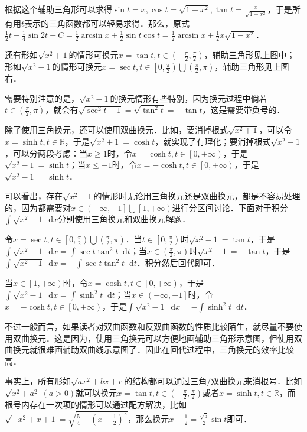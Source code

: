\documentclass{ctexbook}
\newcommand*{\dif}{\mathop{}\!\mathrm{d}}
\begin{document}
\par
根据这个辅助三角形可以求得$\sin{t}=x,\cos{t}=\sqrt{1-x^{2}},\tan{t}=\frac{x}{\sqrt{1-x^{2}}}$，于是所有用$t$表示的三角函数都可以轻易求得．那么，原式$\frac{1}{2}t+\frac{1}{4}\sin{2t}+C=\frac{1}{2}\arcsin{x}+\frac{1}{2}\sin{t}\cos{t}=\frac{1}{2}\arcsin{x}+\frac{1}{2}x\sqrt{1-x^{2}}$．\par
还有形如$\sqrt{x^{2}+1}$的情形可换元$x=\tan{t},t\in\left(-\frac{\pi}{2},\frac{\pi}{2}\right)$，辅助三角形见上图中；形如$\sqrt{x^{2}-1}$的情形可换元$x=\sec{t},t\in\left[0,\frac{\pi}{2}\right)\bigcup\left(\frac{\pi}{2},\pi\right)$，辅助三角形见上图右．\par
需要特别注意的是，$\sqrt{x^{2}-1}$的换元情形有些特别，因为换元过程中倘若$t\in\left(\frac{\pi}{2},\pi\right)$，就会有$\sqrt{\sec^{2}{t}-1}=\sqrt{\tan^{2}{t}}=-\tan{t}$，这是需要带负号的．\par
除了使用三角换元，还可以使用双曲换元．比如，要消掉根式$\sqrt{x^{2}+1}$，可以令$x=\sinh{t},t\in\mathbb{R}$，于是$\sqrt{x^{2}+1}=\cosh{t}$，就实现了有理化；要消掉根式$\sqrt{x^{2}-1}$，可以分两段考虑：当$x\ge1$时，令$x=\cosh{t},t\in\left[0,+\infty\right)$，于是$\sqrt{x^{2}-1}=\sinh{t}$；当$x\le-1$时，令$x=-\cosh{t},t\in\left[0,+\infty\right)$，于是$\sqrt{x^{2}-1}=\sinh{t}$．\par
可以看出，存在$\sqrt{x^{2}-1}$的情形时无论用三角换元还是双曲换元，都是不容易处理的，因为都需要对$x\in\left(-\infty,-1\right]\bigcup\left[1,+\infty\right)$进行分区间讨论．下面对于积分$\int\sqrt{x^{2}-1}\dif{x}$分别使用三角换元和双曲换元解题．\par
令$x=\sec{t},t\in\left[0,\frac{\pi}{2}\right)\bigcup\left(\frac{\pi}{2},\pi\right)$．当$t\in\left[0,\frac{\pi}{2}\right)$时$\sqrt{x^{2}-1}=\tan{t}$，于是$\int\sqrt{x^{2}-1}\dif{x}=\int\sec{t}\tan^{2}{t}\dif{t}$；当$x\in\left(\frac{\pi}{2},\pi\right)$时$\sqrt{x^{2}-1}=-\tan{t}$，于是$\int\sqrt{x^{2}-1}\dif{x}=-\int\sec{t}\tan^{2}{t}\dif{t}$．积分然后回代即可．\par
当$x\in\left[1,+\infty\right)$时，令$x=\cosh{t},t\in\left[0,+\infty\right)$，于是$\int\sqrt{x^{2}-1}\dif{x}=\int\sinh^{2}{t}\dif{t}$；当$x\in\left(-\infty,-1\right]$时，令$x=-\cosh{t},t\in\left[0,+\infty\right)$，于是$\int\sqrt{x^{2}-1}\dif{x}=-\int\sinh^{2}{t}\dif{t}$．\par
不过一般而言，如果读者对双曲函数和反双曲函数的性质比较陌生，就尽量不要使用双曲换元．这是因为，使用三角换元可以方便地画辅助三角形示意图，但使用双曲换元就很难画辅助双曲线示意图了．因此在回代过程中，三角换元的效率比较高．\par
事实上，所有形如$\sqrt{ax^{2}+bx+c}$的结构都可以通过三角/双曲换元来消根号．比如$\sqrt{x^{2}+a^{2}}\;\left(a>0\right)$就可以换元$x=\tan{t},t\in\left(-\frac{\pi}{2},\frac{\pi}{2}\right)$或者$x=\sinh{t},t\in\mathbb{R}$，而根号内存在一次项的情形可以通过配方解决，比如$\sqrt{-x^{2}+x+1}=\sqrt{\frac{5}{4}-\left(x-\frac{1}{2}\right)^{2}}$，那么换元$x-\frac{1}{2}=\frac{\sqrt{5}}{2}\sin{t}$即可．
\end{document}

